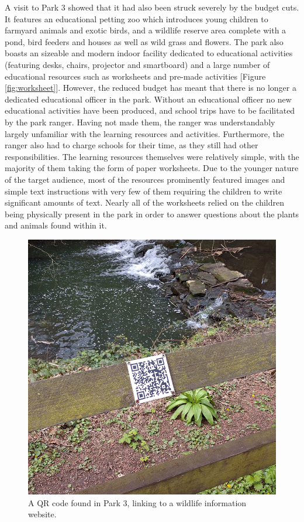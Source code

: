 A visit to Park 3 showed that it had also been struck severely by the budget cuts. It features an educational petting zoo which introduces young children to farmyard animals and exotic birds, and a wildlife reserve area complete with a pond, bird feeders and houses as well as wild grass and flowers. The park also boasts an sizeable and modern indoor facility dedicated to educational activities (featuring desks, chairs, projector and smartboard) and a large number of educational resources such as worksheets and pre-made activities [Figure \ref{fig:worksheet}]. However, the reduced budget has meant that there is no longer a dedicated educational officer in the park. Without an educational officer no new educational activities have been produced, and school trips have to be facilitated by the park ranger. Having not made them, the ranger was understandably largely unfamiliar with the learning resources and activities. Furthermore, the ranger also had to charge schools for their time, as they still had other responsibilities. The learning resources themselves were relatively simple, with the majority of them taking the form of paper worksheets. Due to the younger nature of the target audience, most of the resources prominently featured images and simple text instructions with very few of them requiring the children to write significant amounts of text. Nearly all of the worksheets relied on the children being physically present in the park in order to answer questions about the plants and animals found within it.

\begin{figure}
  \centering
  \includegraphics[width=0.6\columnwidth]{images/chapter04/jesmondQR.jpg}
  \caption[An existing QR code in Park 3]{A QR code found in Park 3, linking to a wildlife information website.}
  \label{fig:jesmondQR}
\end{figure}

